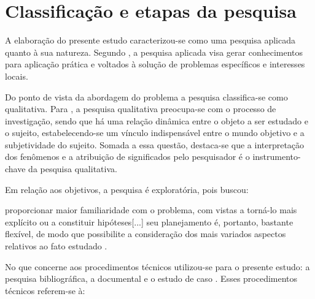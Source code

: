 \section{Classificação e etapas da pesquisa}
\label{natureza}

A elaboração do presente estudo caracterizou-se como uma pesquisa aplicada quanto à sua natureza. Segundo , a pesquisa aplicada visa gerar conhecimentos para aplicação prática e voltados à solução de problemas específicos e interesses locais.

Do ponto de vista da abordagem do problema a pesquisa classifica-se como qualitativa. Para , a pesquisa qualitativa preocupa-se com o processo de investigação, sendo que há uma relação dinâmica entre o objeto a ser estudado e o sujeito, estabelecendo-se um vínculo indispensável entre o mundo objetivo e a subjetividade do sujeito. Somada a essa questão, destaca-se que a interpretação dos fenômenos e a atribuição de significados pelo pesquisador é o instrumento-chave da pesquisa qualitativa.

Em relação aos objetivos, a pesquisa é exploratória, pois buscou:

\begin{citacao}
proporcionar maior familiaridade com o problema, com vistas a torná-lo mais explícito ou a constituir hipóteses[...] seu planejamento é, portanto, bastante flexível, de modo que possibilite a consideração dos mais variados aspectos relativos ao fato estudado \cite[p. 41]{gil2002elaborar}.
\end{citacao}

No que concerne aos procedimentos técnicos utilizou-se para o presente estudo: a pesquisa bibliográfica, a documental e o estudo de caso \cite{gil2002elaborar}. Esses procedimentos técnicos referem-se à:

